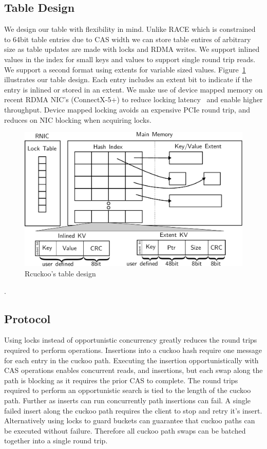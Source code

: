 \subsection{Table Design}

We design our table with flexibility in mind. Unlike RACE
which is constrained to 64bit table entries due to CAS width
we can store table entires of arbitrary size as table
updates are made with locks and RDMA writes. We support
inlined values in the index for small keys and values to
support single round trip reads. We support a second format
using extents for variable sized values.
Figure~\ref{fig:table-diagram} illustrates our table design.
Each entry includes an extent bit to indicate if the entry
is inlined or stored in an extent.  We make use of device
mapped memory on recent RDMA NIC's (ConnectX-5+) to reduce
locking latency~\cite{sherman} and enable higher throughput.
Device mapped locking avoids an expensive PCIe round trip,
and reduces on NIC blocking when acquiring locks.


\begin{figure}[t]
    \includegraphics[width=0.99\linewidth]{fig/table-diagram.pdf}
    \caption{Rcuckoo's table design}
    \label{fig:table-diagram}
\end{figure}.




\subsection{Protocol}

Using locks instead of opportunistic concurrency greatly
reduces the round trips required to perform operations.
Insertions into a cuckoo hash require one message for each
entry in the cuckoo path. Executing the insertion
opportunistically with CAS operations enables concurrent
reads, and insertions, but each swap along the path is
blocking as it requires the prior CAS to complete. The round
trips required to perform an opportunistic search is tied to
the length of the cuckoo path. Further as inserts can run
concurrently path insertions can fail. A single failed
insert along the cuckoo path requires the client to stop and
retry it's insert. Alternatively using locks to guard
buckets can guarantee that cuckoo paths can be executed
without failure. Therefore all cuckoo path swaps can be
batched together into a single round trip.


